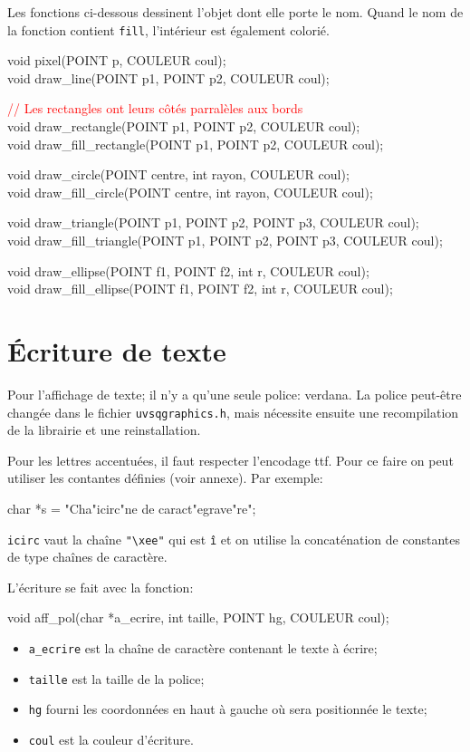 \documentclass{report}
\newcommand\code[1]{
\begin{mdframed}[linecolor=purple,backgroundcolor=blue!10]
{\tt
#1
}
\end{mdframed}
}
\begin{document}
Les fonctions ci-dessous dessinent l'objet dont elle porte le nom.
Quand le nom de la fonction contient \texttt{fill}, l'intérieur est également
colorié.
\code{
void pixel(POINT p, COULEUR coul);\\
void draw\_line(POINT p1, POINT p2, COULEUR coul);

\vspace{3mm}
\noindent
\textcolor{red}{// Les rectangles ont leurs côtés parralèles aux bords}\\
void draw\_rectangle(POINT p1, POINT p2, COULEUR coul); \\
void draw\_fill\_rectangle(POINT p1, POINT p2, COULEUR coul);

\vspace{3mm}
\noindent
void draw\_circle(POINT centre, int rayon, COULEUR coul);\\
void draw\_fill\_circle(POINT centre, int rayon, COULEUR coul);

\vspace{3mm}
\noindent
void draw\_triangle(POINT p1, POINT p2, POINT p3, COULEUR coul);\\
void draw\_fill\_triangle(POINT p1, POINT p2, POINT p3, COULEUR coul);

\vspace{3mm}
\noindent
void draw\_ellipse(POINT f1, POINT f2, int r, COULEUR coul);\\
void draw\_fill\_ellipse(POINT f1, POINT f2, int r, COULEUR coul);
}


\section{Écriture de texte}
Pour l'affichage de texte; il n'y a qu'une seule police: verdana.
La police peut-être changée dans le fichier \texttt{uvsqgraphics.h},
mais nécessite ensuite une recompilation de la librairie et une reinstallation.

Pour les lettres accentuées, il faut respecter l'encodage ttf.
Pour ce faire on peut utiliser les contantes définies (voir annexe).
Par exemple:
\code{
char *s = "Cha"icirc"ne de caract"egrave"re";
}
\texttt{icirc} vaut la chaîne \texttt{"\textbackslash xee"} qui est \texttt{î} et on utilise la concaténation
de constantes de type chaînes de caractère.

L'écriture se fait avec la fonction:
\code{
void aff\_pol(char *a\_ecrire, int taille, POINT hg, COULEUR coul);
}
\begin{itemize}
\item \texttt{a\_ecrire} est la chaîne de caractère contenant le texte à écrire;
\item \texttt{taille} est la taille de la police;
\item \texttt{hg} fourni les coordonnées en haut à gauche où sera positionnée le texte;
\item \texttt{coul} est la couleur d'écriture.
\end{itemize}
\end{document}

